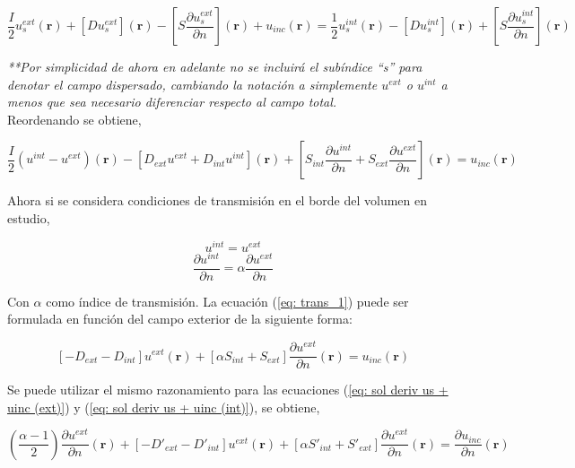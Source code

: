 \documentclass[12pt,letterpaper]{article}
\numberwithin{equation}{section}
\begin{document}
\begin{equation}
\frac{I}{2}u_s^{ext}(\textbf{r}) + \left[D u_s^{ext}\right](\textbf{r}) - \left[S \frac{\partial u_s^{ext}}{\partial n}\right](\textbf{r}) + u_{inc}(\textbf{r}) = \frac{1}{2}u_s^{int}(\textbf{r}) - \left[D u_s^{int}\right](\textbf{r}) + \left[S \frac{\partial u_s^{int}}{\partial n}\right](\textbf{r})		
\end{equation}

\textit{**Por simplicidad de ahora en adelante no se incluirá el subíndice ``s'' para denotar el campo dispersado, cambiando la notación a simplemente $u^{ext}$ o $u^{int}$ a menos que sea necesario diferenciar respecto al campo total.}\\

Reordenando se obtiene,

\begin{equation}
\frac{I}{2}(u^{int}- u^{ext})(\textbf{r}) - \left[D_{ext} u^{ext} + D_{int} u^{int}\right](\textbf{r}) + \left[S_{int} \frac{\partial u^{int}}{\partial n} + S_{ext} \frac{\partial u^{ext}}{\partial n}\right](\textbf{r}) = u_{inc}(\textbf{r}) 
\label{eq: trans_1}		
\end{equation}

Ahora si se considera condiciones de transmisión en el borde del volumen en estudio,

$$u^{int} = u^{ext}$$
$$\frac{\partial u^{int}}{\partial n} =\alpha \frac{\partial u^{ext}}{\partial n}$$

Con $\alpha$ como índice de transmisión. La ecuación (\ref{eq: trans_1}) puede ser formulada en función del campo exterior de la siguiente forma:

\begin{equation}
\left[-D_{ext} - D_{int}\right] u^{ext}(\textbf{r}) + \left[\alpha S_{int} + S_{ext}\right]\frac{\partial u^{ext}}{\partial n}(\textbf{r}) = u_{inc}(\textbf{r}) 
\label{eq: trans_2}		
\end{equation}

Se puede utilizar el mismo razonamiento para las ecuaciones (\ref{eq: sol deriv us + uinc (ext)}) y (\ref{eq: sol deriv us + uinc (int)}), se obtiene,

\begin{equation}
(\frac{\alpha - 1}{2})\frac{\partial u^{ext}}{\partial n}(\textbf{r}) + \left[-D'_{ext} - D'_{int}\right] u^{ext}(\textbf{r}) + \left[\alpha S'_{int} + S'_{ext}\right]\frac{\partial u^{ext}}{\partial n}(\textbf{r}) = \frac{\partial u_{inc}}{\partial n}(\textbf{r}) 
\label{eq: trans_deriv_2}		
\end{equation}
\end{document}
